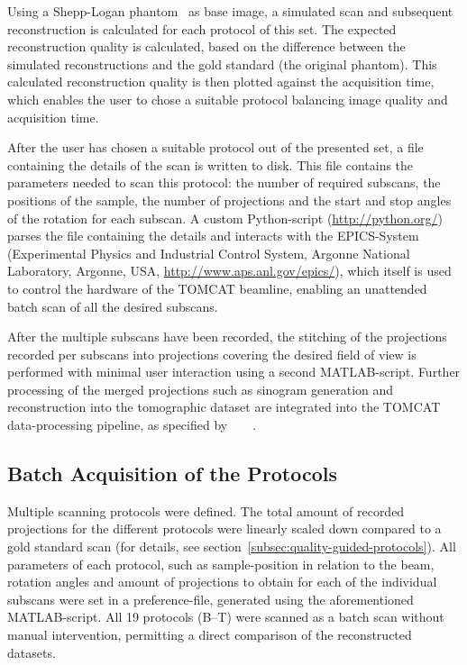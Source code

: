 Using a Shepp-Logan phantom~\cite{Shepp1974} as base image, a simulated scan and subsequent reconstruction is calculated for each protocol of this set. The expected reconstruction quality is calculated, based on the difference between the simulated reconstructions and the gold standard (the original phantom). This calculated reconstruction quality is then plotted against the acquisition time, which enables the user to chose a suitable protocol balancing image quality and acquisition time.

After the user has chosen a suitable protocol out of the presented set, a file containing the details of the scan is written to disk. This file contains the parameters needed to scan this protocol: the number of required subscans, the positions of the sample, the number of projections and the start and stop angles of the rotation for each subscan. A custom Python-script (\url{http://python.org/}) parses the file containing the details and interacts with the EPICS-System (Experimental Physics and Industrial Control System, Argonne National Laboratory, Argonne, USA, \url{http://www.aps.anl.gov/epics/}), which itself is used to control the hardware of the TOMCAT beamline, enabling an unattended batch scan of all the desired subscans.

After the multiple subscans have been recorded, the stitching of the projections recorded per subscans into projections covering the desired field of view is performed with minimal user interaction using a second MATLAB-script. Further processing of the merged projections such as sinogram generation and reconstruction into the tomographic dataset are integrated into the TOMCAT data-processing pipeline, as specified by%
\ifhtml%
	~\citet{Hintermueller2009}%
\else%
	~%
\fi%
.

\subsection{Batch Acquisition of the Protocols}
Multiple scanning protocols were defined. The total amount of recorded projections for the different protocols were linearly scaled down compared to a gold standard scan (for details, see section~\ref{subsec:quality-guided-protocols}). All parameters of each protocol, such as sample-position in relation to the beam, rotation angles and amount of projections to obtain for each of the individual subscans were set in a preference-file, generated using the aforementioned MATLAB-script. All 19 protocols (B--T) were scanned as a batch scan without manual intervention, permitting a direct comparison of the reconstructed datasets.

